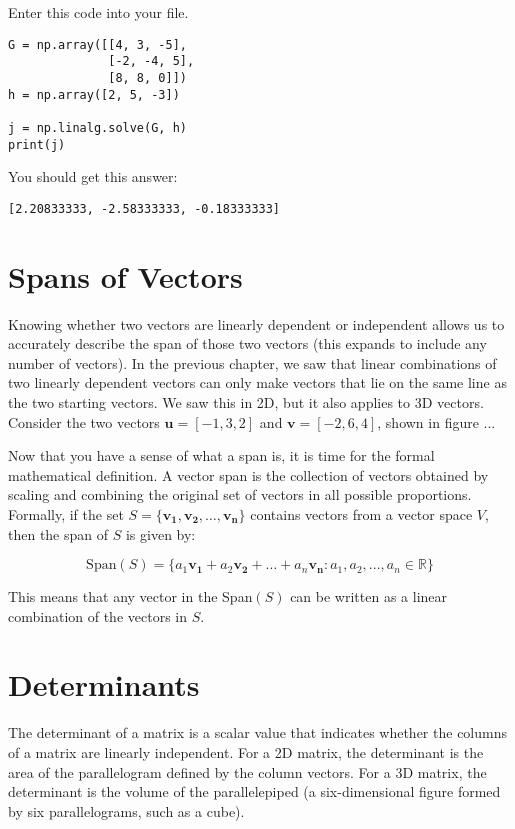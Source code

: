 Enter this code into your file. 
\begin{Verbatim}
G = np.array([[4, 3, -5], 
              [-2, -4, 5], 
              [8, 8, 0]])
h = np.array([2, 5, -3])

j = np.linalg.solve(G, h)
print(j)
\end{Verbatim}
You should get this answer:
\begin{Verbatim}
[2.20833333, -2.58333333, -0.18333333]
\end{Verbatim}

\section{Spans of Vectors}
Knowing whether two vectors are linearly dependent or independent allows us to 
accurately describe the span of those two vectors (this expands to include any 
number of vectors). In the previous chapter, we saw that linear combinations of 
two linearly dependent vectors can only make vectors that lie on the same line 
as the two starting vectors. We saw this in 2D, but it also applies to 3D 
vectors. Consider the two vectors $\mathbf{u} = \left[ -1, 3, 2 \right]$ and 
$\mathbf{v} = \left[ -2, 6, 4 \right]$, shown in figure ...

Now that you have a sense of what a span is, it is time for the formal 
mathematical definition. A vector span is the collection of vectors obtained 
by scaling and combining the original set of vectors in all possible 
proportions. Formally, if the set $S = \{\mathbf{v_1}, \mathbf{v_2}, \dots, 
\mathbf{v_n}\}$ contains vectors from a vector space $V$, then the span of $S$ 
is given by:

\begin{equation}
\text{Span}(S) = \{a_1 \mathbf{v_1} + a_2 \mathbf{v_2} + \dots + a_n 
\mathbf{v_n} : a_1, a_2, ..., a_n \in \mathbb{R}\}
\end{equation}

This means that any vector in the Span$(S)$ can be written as a linear 
combination of the vectors in $S$.

\section{Determinants}
The determinant of a matrix is a scalar value that indicates whether the 
columns of a matrix are linearly independent. For a 2D matrix, the determinant 
is the area of the parallelogram defined by the column vectors. For a 3D 
matrix, the determinant is the volume of the parallelepiped (a six-dimensional 
figure formed by six parallelograms, such as a cube). 

